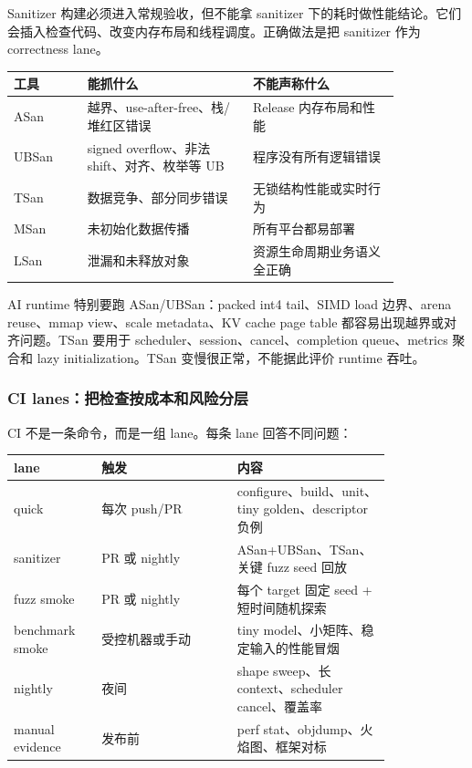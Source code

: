 Sanitizer 构建必须进入常规验收，但不能拿 sanitizer 下的耗时做性能结论。它们会插入检查代码、改变内存布局和线程调度。正确做法是把 sanitizer 作为 correctness lane。

\begin{center}
\small
\begin{tabular}{p{0.16\linewidth}p{0.36\linewidth}p{0.32\linewidth}}
\toprule
工具 & 能抓什么 & 不能声称什么 \\
\midrule
ASan & 越界、use-after-free、栈/堆红区错误 & Release 内存布局和性能 \\
UBSan & signed overflow、非法 shift、对齐、枚举等 UB & 程序没有所有逻辑错误 \\
TSan & 数据竞争、部分同步错误 & 无锁结构性能或实时行为 \\
MSan & 未初始化数据传播 & 所有平台都易部署 \\
LSan & 泄漏和未释放对象 & 资源生命周期业务语义全正确 \\
\bottomrule
\end{tabular}
\end{center}

AI runtime 特别要跑 ASan/UBSan：packed int4 tail、SIMD load 边界、arena reuse、mmap view、scale metadata、KV cache page table 都容易出现越界或对齐问题。TSan 要用于 scheduler、session、cancel、completion queue、metrics 聚合和 lazy initialization。TSan 变慢很正常，不能据此评价 runtime 吞吐。

\subsubsection{CI lanes：把检查按成本和风险分层}

CI 不是一条命令，而是一组 lane。每条 lane 回答不同问题：

\begin{center}
\small
\begin{tabular}{p{0.18\linewidth}p{0.30\linewidth}p{0.34\linewidth}}
\toprule
lane & 触发 & 内容 \\
\midrule
quick & 每次 push/PR & configure、build、unit、tiny golden、descriptor 负例 \\
sanitizer & PR 或 nightly & ASan+UBSan、TSan、关键 fuzz seed 回放 \\
fuzz smoke & PR 或 nightly & 每个 target 固定 seed + 短时间随机探索 \\
benchmark smoke & 受控机器或手动 & tiny model、小矩阵、稳定输入的性能冒烟 \\
nightly & 夜间 & shape sweep、长 context、scheduler cancel、覆盖率 \\
manual evidence & 发布前 & perf stat、objdump、火焰图、框架对标 \\
\bottomrule
\end{tabular}
\end{center}


